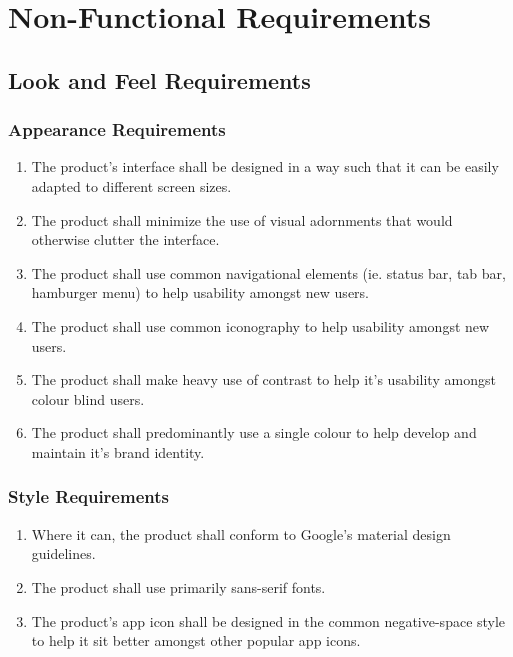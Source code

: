 \documentclass[]{article}
\begin{document}

\section{Non-Functional Requirements}
\label{sec:non-functional_requirements}

\newcommand{\holdEnum}{\setcounter{_enumi}{\value{enumi}}}
\newcommand{\resumeEnum}{\setcounter{enumi}{\value{_enumi}}}

\subsection{Look and Feel Requirements}
\label{sub:look_and_feel_requirements}

\subsubsection{Appearance Requirements}
\label{ssub:appearance_requirements}
\begin{enumerate}[{LF}1. ]
	\item The product's interface shall be designed in a way such that it can be easily adapted to different screen sizes.
	\item The product shall minimize the use of visual adornments that would otherwise clutter the interface.
	\item The product shall use common navigational elements (ie. status bar, tab bar, hamburger menu) to help usability amongst new users.
	\item The product shall use common iconography to help usability amongst new users. 
	\item The product shall make heavy use of contrast to help it's usability amongst colour blind users.
	\item The product shall predominantly use a single colour to help develop and maintain it's brand identity.
	\holdEnum
\end{enumerate}

\subsubsection{Style Requirements}
\label{ssub:style_requirements}
\begin{enumerate}[{LF}1.]
	\resumeEnum
	\item Where it can, the product shall conform to Google's material design guidelines.
	\item The product shall use primarily sans-serif fonts.
	\item The product's app icon shall be designed in the common negative-space style to help it sit better amongst other popular app icons.  
\end{enumerate}
\end{document}
